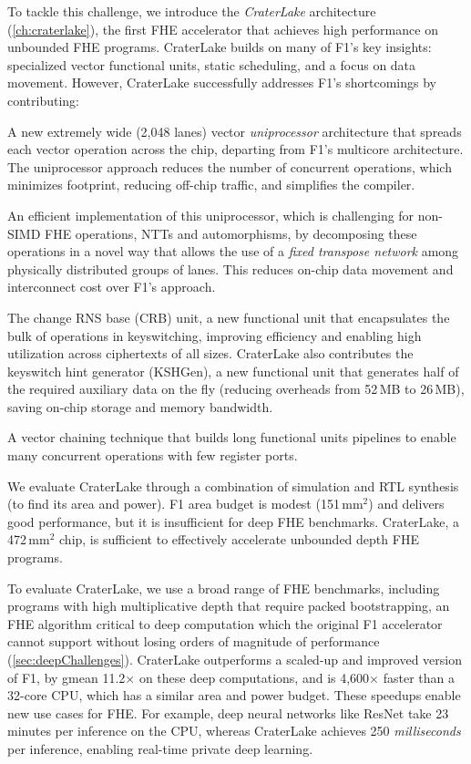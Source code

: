 To tackle this challenge, we introduce the \emph{CraterLake} architecture
(\autoref{ch:craterlake}), the first FHE accelerator
that achieves high performance on unbounded FHE programs. CraterLake builds on
many of F1's key insights: specialized vector functional units, static
scheduling, and a focus on data movement. However, CraterLake successfully
addresses F1's shortcomings by contributing:
\begin{compactitem}
\item A new extremely wide (2,048 lanes) vector \emph{uniprocessor}
    architecture that spreads each vector operation across the chip, departing
    from F1's multicore architecture. The uniprocessor approach reduces the
    number of concurrent operations, which minimizes footprint, reducing
    off-chip traffic, and simplifies the compiler.
\item An efficient implementation of this uniprocessor, which is
    challenging for non-SIMD FHE operations, NTTs and automorphisms, by
    decomposing these operations in a novel way that allows the use of a
    \emph{fixed transpose network} among physically distributed groups of
    lanes. This reduces on-chip data movement and interconnect cost over F1's
    approach.
\item The change RNS base (CRB) unit, a new functional unit that encapsulates
    the bulk of operations in keyswitching, improving efficiency and
    enabling high utilization across ciphertexts of all sizes. CraterLake also
    contributes the keyswitch hint generator (KSHGen), a new functional unit
    that generates half of the required auxiliary data on the fly (reducing
    overheads from 52\,MB to 26\,MB), saving on-chip storage and memory
    bandwidth.
\item A vector chaining technique that builds long functional units pipelines
    to enable many concurrent operations with few register ports.
\end{compactitem}

We evaluate CraterLake through a combination of simulation and RTL synthesis
(to find its area and power). F1 area budget is modest (151\,mm$^2$) and
delivers good performance, but it is insufficient for deep FHE benchmarks.
CraterLake, a 472\,mm$^2$ chip, is sufficient to effectively accelerate
unbounded depth FHE programs.

To evaluate CraterLake, we use a broad range of FHE benchmarks, including
programs with high multiplicative depth that require packed bootstrapping, an
FHE algorithm critical to deep computation which the original F1 accelerator
cannot support without losing orders of magnitude of performance
(\autoref{sec:deepChallenges}). CraterLake outperforms a scaled-up and improved
version of F1, by gmean 11.2$\times$ on these deep computations, and is
4,600$\times$ faster than a 32-core CPU, which has a similar area and power
budget. These speedups enable new use cases for FHE. For example, deep neural
networks like ResNet take 23 minutes per inference on the CPU, whereas
CraterLake achieves 250 \emph{milliseconds} per inference, enabling real-time
private deep learning.
